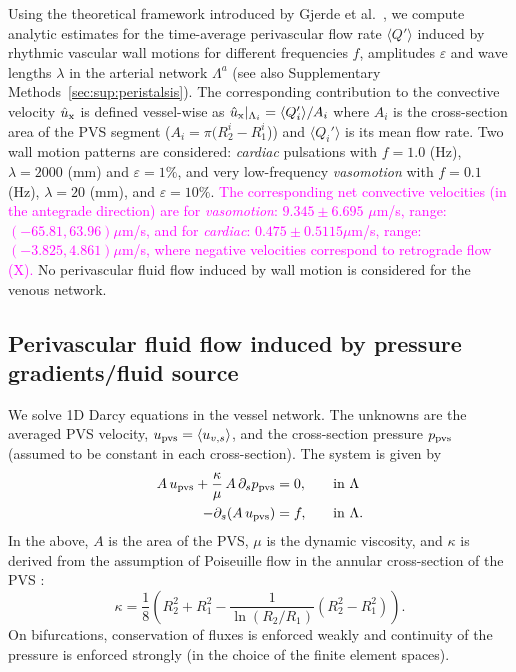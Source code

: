 \documentclass[fleqn,10pt]{wlscirep}
\newcommand{\mer}[1]{\textcolor{magenta}{#1}}
\begin{document}
Using the theoretical framework introduced by Gjerde et
al.~\cite{gjerde2023directional}, we compute analytic estimates for
the time-average perivascular flow rate $\langle Q' \rangle$ induced
by rhythmic vascular wall motions for different frequencies $f$,
amplitudes $\varepsilon$ and wave lengths $\lambda$ in the arterial
network $\Lambda^a$ (see also Supplementary
Methods~\ref{sec:sup:peristalsis}). The corresponding contribution to
the convective velocity $\hat{u}_{\rm x}$ is defined vessel-wise as
$\hat{u}_{\rm x}|_{\Lambda_i} = \langle Q'_i \rangle/A_i$ where $A_i$
is the cross-section area of the PVS segment ($A_i = \pi (R_2^i -
R_1^i$)) and $\langle Q_i' \rangle$ is its mean flow rate. Two wall
motion patterns are considered: \emph{cardiac} pulsations with $f =
1.0$ (Hz), $\lambda = 2000$ (mm) and $\varepsilon = 1\%$, and very
low-frequency \emph{vasomotion} with $f = 0.1$ (Hz), $\lambda = 20$
(mm), and $\varepsilon = 10\%$. \mer{The corresponding net convective
velocities (in the antegrade direction) are for \emph{vasomotion}:
$9.345 \pm 6.695$ $\mu$m/s, range: $(-65.81, 63.96) \mu$m/s, and for
\emph{cardiac}: $0.475 \pm 0.5115 \mu$m/s, range: $(- 3.825, 4.861)
\mu$m/s, where negative velocities correspond to retrograde flow
(\Cref{fig:pvs}\mer{X}).} No perivascular fluid flow induced by wall
motion is considered for the venous network.

\subsection*{Perivascular fluid flow induced by pressure gradients/fluid source}

We solve 1D Darcy equations in the vessel network. The unknowns are the averaged PVS velocity, $u_{\rm pvs} = \langle u_{v,s} \rangle$, and the cross-section pressure $p_{\rm pvs} $ (assumed to be constant in each cross-section). The system is given by  \cite{daversin2022geometrically, gjerde2024directional} 
\begin{alignat}{2}
A \,  u_{\rm pvs}   + \frac{\kappa}{\mu} \, A \, \partial_{s} p_{\rm pvs} & = 0, &&  \quad \rm in  \,\, \Lambda  \\ 
-\partial_s (A \, u_{\rm pvs}) & = f, && \quad \rm in  \,\, \Lambda .  
\end{alignat} 
In the above, $A$ is the area of the PVS, $\mu$ is the dynamic viscosity, and $\kappa$ is derived from the assumption of Poiseuille
flow in the annular cross-section of the PVS \cite{daversin2022geometrically,tithof2022network}: 
\begin{equation}
\kappa = \frac18 \left( R_2^2 + R_1^2 - \frac{1}{\ln(R_2/R_1)} (R_2^2- R_1^2) \right). 
\end{equation}
On bifurcations, conservation of fluxes is enforced weakly and continuity of the pressure is enforced strongly (in the choice of the finite element spaces). 
\end{document}
